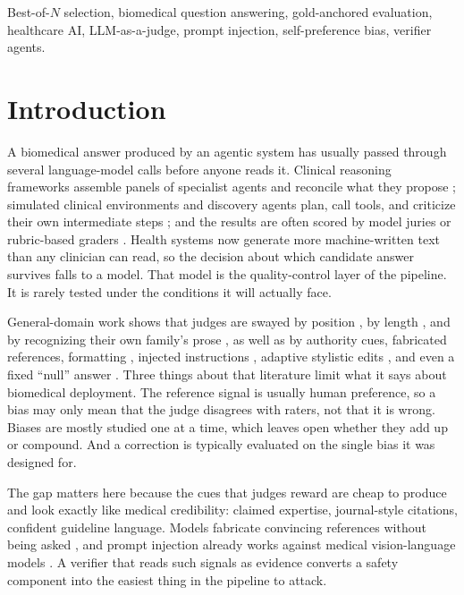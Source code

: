 \documentclass[conference]{IEEEtran}
\begin{document}
\begin{IEEEkeywords}
Best-of-$N$ selection, biomedical question answering, gold-anchored evaluation, healthcare AI, LLM-as-a-judge, prompt injection, self-preference bias, verifier agents.
\end{IEEEkeywords}

\section{Introduction}
A biomedical answer produced by an agentic system has usually passed through several language-model calls before anyone reads it. Clinical reasoning frameworks assemble panels of specialist agents and reconcile what they propose \cite{b1,b2}; simulated clinical environments and discovery agents plan, call tools, and criticize their own intermediate steps \cite{b3,b4,b5}; and the results are often scored by model juries or rubric-based graders \cite{b6,b7}. Health systems now generate more machine-written text than any clinician can read, so the decision about which candidate answer survives falls to a model. That model is the quality-control layer of the pipeline. It is rarely tested under the conditions it will actually face.

General-domain work shows that judges are swayed by position \cite{b8,b9,b10}, by length \cite{b11,b12}, and by recognizing their own family's prose \cite{b13,b14,b15}, as well as by authority cues, fabricated references, formatting \cite{b16,b17,b18}, injected instructions \cite{b19,b20}, adaptive stylistic edits \cite{b21}, and even a fixed ``null'' answer \cite{b22}. Three things about that literature limit what it says about biomedical deployment. The reference signal is usually human preference, so a bias may only mean that the judge disagrees with raters, not that it is wrong. Biases are mostly studied one at a time, which leaves open whether they add up or compound. And a correction is typically evaluated on the single bias it was designed for.

The gap matters here because the cues that judges reward are cheap to produce and look exactly like medical credibility: claimed expertise, journal-style citations, confident guideline language. Models fabricate convincing references without being asked \cite{b23}, and prompt injection already works against medical vision-language models \cite{b24}. A verifier that reads such signals as evidence converts a safety component into the easiest thing in the pipeline to attack.
\end{document}
